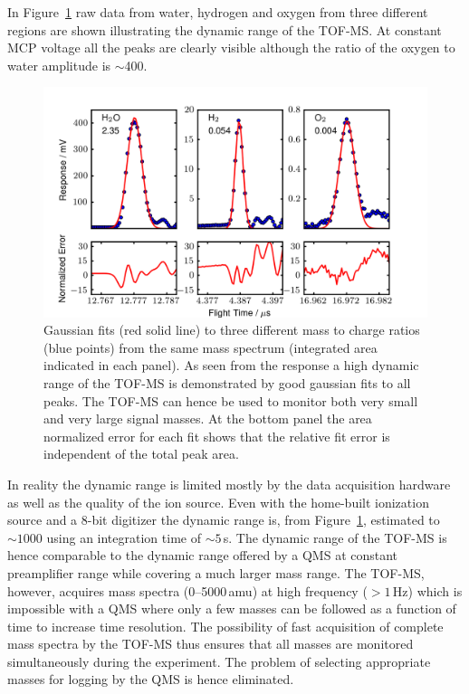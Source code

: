\documentclass[aip,rsi]{revtex4-1}
\begin{document}
In Figure~\ref{fig:dynamic_range} raw data from water, hydrogen and oxygen from three different regions are shown illustrating the dynamic range of the TOF-MS. At constant MCP voltage all the peaks are clearly visible although the ratio of the oxygen to water amplitude is $\sim$400. 
\begin{figure}
 \includegraphics[width=14cm]{dynamic_range.png}%
 \caption{Gaussian fits (red solid line) to three different mass to charge ratios (blue points) from the same mass spectrum (integrated area indicated in each panel). As seen from the response a high dynamic range of the TOF-MS is demonstrated by good gaussian fits to all peaks. The TOF-MS can hence be used to monitor both very small and very large signal masses. At the bottom panel the area normalized error for each fit shows that the relative fit error is independent of the total peak area.\label{fig:dynamic_range}}%
\end{figure}
In reality the dynamic range is limited mostly by the data acquisition hardware as well as the quality of the ion source. Even with the home-built ionization source and a 8-bit digitizer the dynamic range is, from Figure~\ref{fig:dynamic_range}, estimated to $\sim1000$ using an integration time of $\sim5$\,s. The dynamic range of the TOF-MS is hence comparable to the dynamic range offered by a QMS at constant preamplifier range while covering a much larger mass range. The TOF-MS, however, acquires mass spectra (\mbox{0--5000}\,amu) at high frequency ($>1$\,Hz) which is impossible with a QMS where only a few masses can be followed as a function of time to increase time resolution. The possibility of fast acquisition of complete mass spectra by the TOF-MS thus ensures that all masses are monitored simultaneously during the experiment. The problem of selecting appropriate masses for logging by the QMS is hence eliminated.
\end{document}
